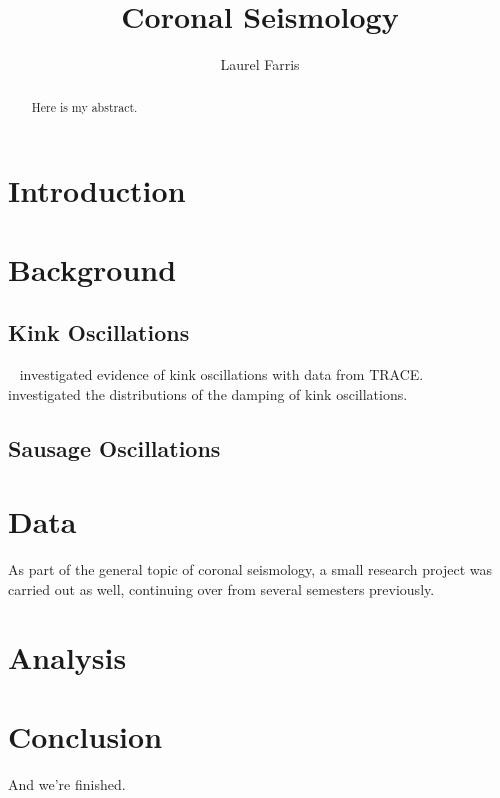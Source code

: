 \documentclass[preprint2]{aastex}
\begin{document}
\title{Coronal Seismology}
\author{Laurel Farris}

\begin{abstract}
Here is my abstract.
\end{abstract}

\section{Introduction}

\section{Background}

\subsection{Kink Oscillations}
~\cite{kink_1} investigated evidence of kink oscillations
with data from TRACE.
~\cite{kink_2} investigated the distributions of the damping
of kink oscillations.

\subsection{Sausage Oscillations}


\section{Data}
As part of the general topic of coronal seismology,
a small research project was carried out as well, continuing
over from several semesters previously.

\section{Analysis}

\section{Conclusion}
And we're finished.


\end{document}
